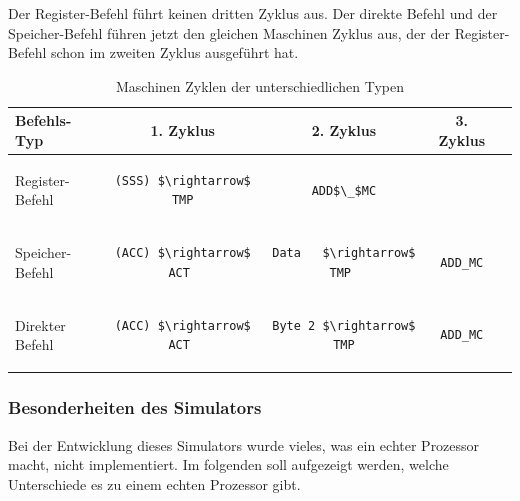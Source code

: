 \documentclass[12pt]{article}
\newcommand{\imgSpaceBefore}{\\[0.2cm]}
\begin{document}
\noindent
Der Register-Befehl führt keinen dritten Zyklus aus.
Der direkte Befehl und der Speicher-Befehl führen jetzt den gleichen Maschinen Zyklus aus, der der Register-Befehl schon im zweiten Zyklus ausgeführt hat.
\imgSpaceBefore
\begin{table}[H]
\centering
\caption{Maschinen Zyklen der unterschiedlichen Typen}
\label{table:mc_types}
\begin{tabular}{|l|c|c|c|c| } 
 \hline
 Befehls-Typ & 1. Zyklus & 2. Zyklus & 3. Zyklus \\
 \hline 
 Register-Befehl
 &
 \begin{lstlisting}
(SSS) $\rightarrow$ TMP
 \end{lstlisting}
 &
 \begin{lstlisting}
ADD$\_$MC
 \end{lstlisting}
 & \\
 
 Speicher-Befehl & 
 \begin{lstlisting}
(ACC) $\rightarrow$ ACT 
 \end{lstlisting}  
  & 
 \begin{lstlisting}
Data   $\rightarrow$ TMP 
 \end{lstlisting} 
 & 
 \begin{lstlisting}
ADD_MC
 \end{lstlisting} 
 \\ 
 
 Direkter Befehl & 
 \begin{lstlisting}
(ACC) $\rightarrow$ ACT 
 \end{lstlisting} 
 & 
 \begin{lstlisting}
Byte 2 $\rightarrow$ TMP
 \end{lstlisting} 
 &
  \begin{lstlisting}
ADD_MC
 \end{lstlisting}
 \\
 
 \hline
\end{tabular}
\end{table}


\subsubsection{Besonderheiten des Simulators}
Bei der Entwicklung dieses Simulators wurde vieles, was ein echter Prozessor macht, nicht implementiert. Im folgenden soll aufgezeigt werden, welche Unterschiede es zu einem echten Prozessor gibt.
\\
\end{document}
